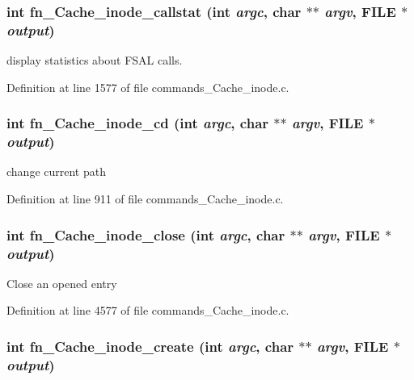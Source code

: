 \subsubsection[{fn\_\-Cache\_\-inode\_\-callstat}]{\setlength{\rightskip}{0pt plus 5cm}int fn\_\-Cache\_\-inode\_\-callstat (int {\em argc}, \/  char $\ast$$\ast$ {\em argv}, \/  FILE $\ast$ {\em output})}\label{commands__Cache__inode_8c_711e4a11e5bf3bb7fd4be1cdb5f33010}


display statistics about FSAL calls. 

Definition at line 1577 of file commands\_\-Cache\_\-inode.c.
\subsubsection[{fn\_\-Cache\_\-inode\_\-cd}]{\setlength{\rightskip}{0pt plus 5cm}int fn\_\-Cache\_\-inode\_\-cd (int {\em argc}, \/  char $\ast$$\ast$ {\em argv}, \/  FILE $\ast$ {\em output})}\label{commands__Cache__inode_8c_de5ad3cf431b9c4586c59b909c87c6b9}


change current path 

Definition at line 911 of file commands\_\-Cache\_\-inode.c.
\subsubsection[{fn\_\-Cache\_\-inode\_\-close}]{\setlength{\rightskip}{0pt plus 5cm}int fn\_\-Cache\_\-inode\_\-close (int {\em argc}, \/  char $\ast$$\ast$ {\em argv}, \/  FILE $\ast$ {\em output})}\label{commands__Cache__inode_8c_f0ca1153461f207ba7c227ef1563feef}


Close an opened entry 

Definition at line 4577 of file commands\_\-Cache\_\-inode.c.
\subsubsection[{fn\_\-Cache\_\-inode\_\-create}]{\setlength{\rightskip}{0pt plus 5cm}int fn\_\-Cache\_\-inode\_\-create (int {\em argc}, \/  char $\ast$$\ast$ {\em argv}, \/  FILE $\ast$ {\em output})}\label{commands__Cache__inode_8c_6c91f15dff648eb0932a0bd012182818}


